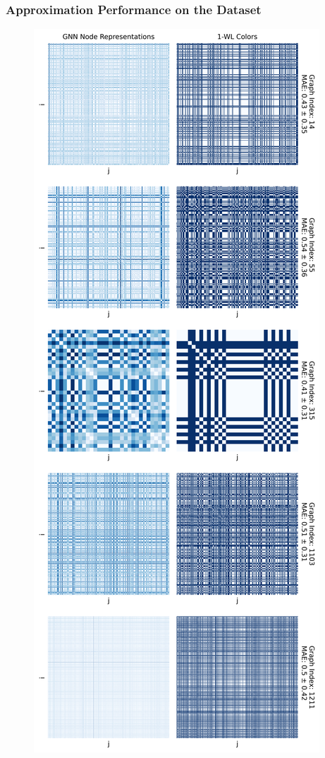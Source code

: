 \subsubsection{Approximation Performance on the \reddit Dataset}
\begin{figure}[H]
    \centering
    \begin{minipage}[b]{0.45992852703\textwidth}
        \centering
        \includegraphics[width=\textwidth, left]{Figures/heatmaps_REDDIT-BINARY_0.png}

\end{minipage}
\end{figure}
